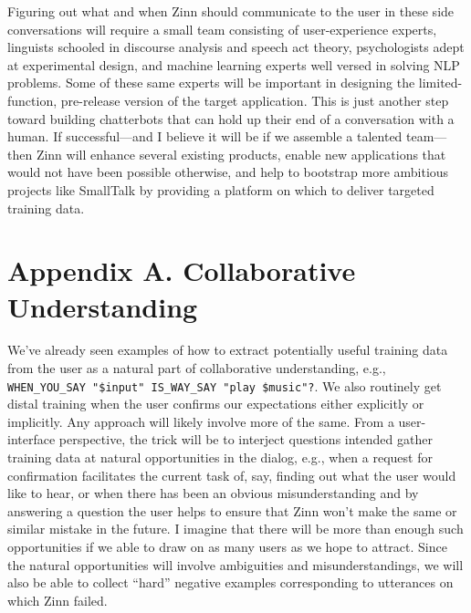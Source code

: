 \documentclass[letterpaper,11pt]{article}
\begin{document}
Figuring out what and when Zinn should communicate to the user in these side conversations will require a small team consisting of user-experience experts, linguists schooled in discourse analysis and speech act theory, psychologists adept at experimental design, and machine learning experts well versed in solving NLP problems. Some of these same experts will be important in designing the limited-function, pre-release version of the target application.  This is just another step toward building chatterbots that can hold up their end of a conversation with a human. If successful---and I believe it will be if we assemble a talented team---then Zinn will enhance several existing products, enable new applications that would not have been possible otherwise, and help to bootstrap more ambitious projects like SmallTalk by providing a platform on which to deliver targeted training data.




\section*{Appendix A. Collaborative Understanding}

We've already seen examples of how to extract potentially useful training data from the user as a natural part of collaborative understanding, e.g., {\tt{WHEN\_YOU\_SAY "\$input" IS\_WAY\_SAY "play \$music"?}}. We also routinely get distal training when the user confirms our expectations either explicitly or implicitly. Any approach will likely involve more of the same. From a user-interface perspective, the trick will be to interject questions intended gather training data at natural opportunities in the dialog, e.g., when a request for confirmation facilitates the current task of, say, finding out what the user would like to hear, or when there has been an obvious misunderstanding and by answering a question the user helps to ensure that Zinn won't make the same or similar mistake in the future. I imagine that there will be more than enough such opportunities if we able to draw on as many users as we hope to attract.  Since the natural opportunities will involve ambiguities and misunderstandings, we will also be able to collect ``hard'' negative examples corresponding to utterances on which Zinn failed.
\end{document}
